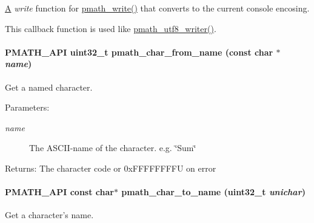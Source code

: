 \hyperlink{class_a}{A} {\em write\/} function for \hyperlink{group__objects_g9f909b9eb04317260ee8630d10e5a7c6}{pmath\_\-write()} that converts to the current console encosing. 

This callback function is used like \hyperlink{group__strings_g5e7a9b1a5eb8861e94dc1bea92c77424}{pmath\_\-utf8\_\-writer()}. \hypertarget{group__strings_g963fd4f434edb806b3f2262726d849be}{
\paragraph[{pmath\_\-char\_\-from\_\-name}]{\setlength{\rightskip}{0pt plus 5cm}PMATH\_\-API uint32\_\-t pmath\_\-char\_\-from\_\-name (const char $\ast$ {\em name})}\hfill}
\label{group__strings_g963fd4f434edb806b3f2262726d849be}


Get a named character. 

\begin{Desc}
\item[Parameters:]
\begin{description}
\item[{\em name}]The ASCII-name of the character. e.g. \char`\"{}Sum\char`\"{} \end{description}
\end{Desc}
\begin{Desc}
\item[Returns:]The character code or 0xFFFFFFFFU on error \end{Desc}
\hypertarget{group__strings_g21de2fb0e4e344d00d728f1c2fc4a941}{
\paragraph[{pmath\_\-char\_\-to\_\-name}]{\setlength{\rightskip}{0pt plus 5cm}PMATH\_\-API const char$\ast$ pmath\_\-char\_\-to\_\-name (uint32\_\-t {\em unichar})}\hfill}
\label{group__strings_g21de2fb0e4e344d00d728f1c2fc4a941}


Get a character's name. 

